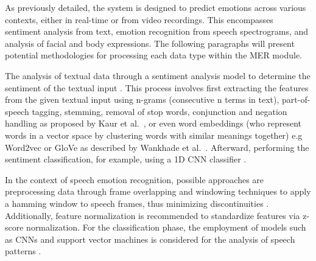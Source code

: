 \documentclass[runningheads]{llncs}
\begin{document}
As previously detailed, the system is designed to predict emotions across various contexts, either in real-time or from video recordings. This encompasses sentiment analysis from text, emotion recognition from speech spectrograms, and analysis of facial and body expressions. The following paragraphs will present potential methodologies for processing each data type within the MER module.

The analysis of textual data through a sentiment analysis model to determine the sentiment of the textual input \cite{hajek_neural_2021}. This process involves first extracting the features from the given textual input using n-grams (consecutive n terms in text), part-of-speech tagging, stemming, removal of stop words, conjunction and negation handling as proposed by Kaur et al.~\cite{kaur_survey_2017}, or even word embeddings (who represent words in a vector space by clustering words with similar meanings together) e.g Word2vec or GloVe as described by Wankhade et al.~\cite{wankhade_survey_2022}. Afterward, performing the sentiment classification, for example, using a 1D CNN classifier \cite{hung_beyond_2023}.

In the context of speech emotion recognition, possible approaches are preprocessing data through frame overlapping and windowing techniques to apply a hamming window to speech frames, thus minimizing discontinuities \cite{Ayadi2011, de_lope_hybrid_2022}. Additionally, feature normalization is recommended to standardize features via z-score normalization. For the classification phase, the employment of models such as CNNs and support vector machines is considered for the analysis of speech patterns \cite{Badshah2017}.
\end{document}
